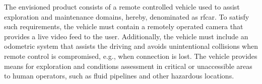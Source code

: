 The envisioned product consists of a remote controlled vehicle used to assist
exploration and maintenance domains, hereby, denominated as \gls{rfcar}. To satisfy such requirements, the vehicle must
contain a remotely operated camera that provides a live video feed to the user.
Additionally, the vehicle must include an odometric system that assists the
driving and avoids unintentional collisions when remote control is compromised, e.g., when connection is lost.
The vehicle provides means for exploration and conditions assessment in critical
or unaccessible areas to human operators, such as fluid pipelines and other hazardous locations.
%
